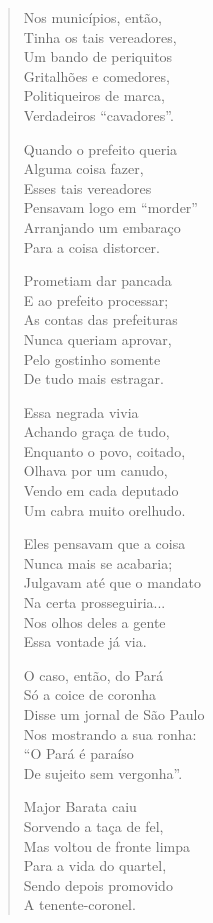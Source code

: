 \begin{verse}
Nos municípios, então,\\
Tinha os tais vereadores,\\
Um bando de periquitos\\
Gritalhões e comedores,\\
Politiqueiros de marca,\\
Verdadeiros “cavadores”.

Quando o prefeito queria\\
Alguma coisa fazer,\\
Esses tais vereadores\\
Pensavam logo em “morder”\\
Arranjando um embaraço\\
Para a coisa distorcer.

Prometiam dar pancada\\
E ao prefeito processar;\\
As contas das prefeituras\\
Nunca queriam aprovar,\\
Pelo gostinho somente\\
De tudo mais estragar.

Essa negrada vivia\\
Achando graça de tudo,\\
Enquanto o povo, coitado,\\
Olhava por um canudo,\\
Vendo em cada deputado\\
Um cabra muito orelhudo.
\pagebreak

Eles pensavam que a coisa\\
Nunca mais se acabaria;\\
Julgavam até que o mandato\\
Na certa prosseguiria...\\
Nos olhos deles a gente\\
Essa vontade já via.

O caso, então, do Pará\\
Só a coice de coronha\\
Disse um jornal de São Paulo\\
Nos mostrando a sua ronha:\\
“O Pará é paraíso\\
De sujeito sem vergonha”.

Major Barata caiu\\
Sorvendo a taça de fel,\\
Mas voltou de fronte limpa\\
Para a vida do quartel,\\
Sendo depois promovido\\
A tenente-coronel.


\end{verse}
